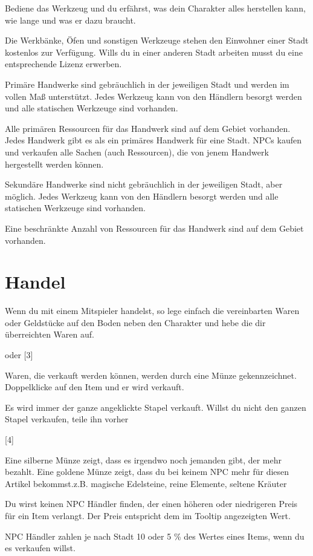 \documentclass[a4paper,11pt]{book}
\begin{document}
Bediene das Werkzeug und du erfährst, was dein Charakter alles herstellen kann, wie lange und was er dazu braucht.

Die Werkbänke, Öfen und sonstigen Werkzeuge stehen den Einwohner einer Stadt kostenlos zur Verfügung. Wills du in einer anderen Stadt arbeiten musst du eine entsprechende Lizenz erwerben.

Primäre Handwerke sind gebräuchlich in der jeweiligen Stadt und werden im vollen Maß unterstützt. Jedes Werkzeug kann von den Händlern besorgt werden und alle statischen Werkzeuge sind vorhanden.

Alle primären Ressourcen für das Handwerk sind auf dem Gebiet vorhanden. Jedes Handwerk gibt es als ein primäres Handwerk für eine Stadt. NPCs kaufen und verkaufen alle Sachen (auch Ressourcen), die von jenem Handwerk hergestellt werden können.

Sekundäre Handwerke sind nicht gebräuchlich in der jeweiligen Stadt, aber möglich. Jedes Werkzeug kann von den Händlern besorgt werden und alle statischen Werkzeuge sind vorhanden.

Eine beschränkte Anzahl von Ressourcen für das Handwerk sind auf dem Gebiet vorhanden.

\section{Handel}

Wenn du mit einem Mitspieler handelst, so lege einfach die vereinbarten Waren oder Geldstücke auf den Boden neben den Charakter und hebe die dir überreichten Waren auf.

oder  [3]

Waren, die verkauft werden können, werden durch eine Münze gekennzeichnet. Doppelklicke auf den Item und er wird verkauft.

Es wird immer der ganze angeklickte Stapel verkauft. Willst du nicht den ganzen Stapel verkaufen, teile ihn vorher

[4]

Eine silberne Münze zeigt, dass es irgendwo noch jemanden gibt, der mehr bezahlt. Eine goldene Münze zeigt, dass du bei keinem NPC mehr für diesen Artikel bekommst.z.B. magische Edelsteine, reine Elemente, seltene Kräuter

Du wirst keinen NPC Händler finden, der einen höheren oder niedrigeren Preis für ein Item verlangt. Der Preis entspricht dem im Tooltip angezeigten Wert. 

NPC Händler zahlen je nach Stadt 10 oder 5 \% des Wertes eines Items, wenn du es verkaufen willst. 
\end{document}
